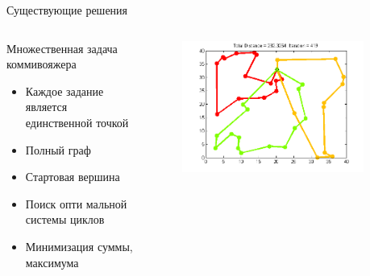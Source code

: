 \documentclass{beamer}
\begin{document}
\begin{frame}{Существующие решения}
\begin{columns}[onlytextwidth, t]
    \begin{column}{0.6\textwidth}
        Множественная задача коммивояжера
        \begin{itemize}
        \item Каждое задание является единственной точкой
        \item Полный граф
        \item Стартовая вершина
        \item Поиск опти мальной системы циклов
        \item Минимизация суммы, максимума
        \end{itemize}

    \end{column}
    \begin{column}{0.4\textwidth}

        \begin{figure}[here]
            \includegraphics[scale=0.4]{images/mtsp.png}
        \end{figure}
    \end{column}

​\end{columns}

\end{frame}
\end{document}
